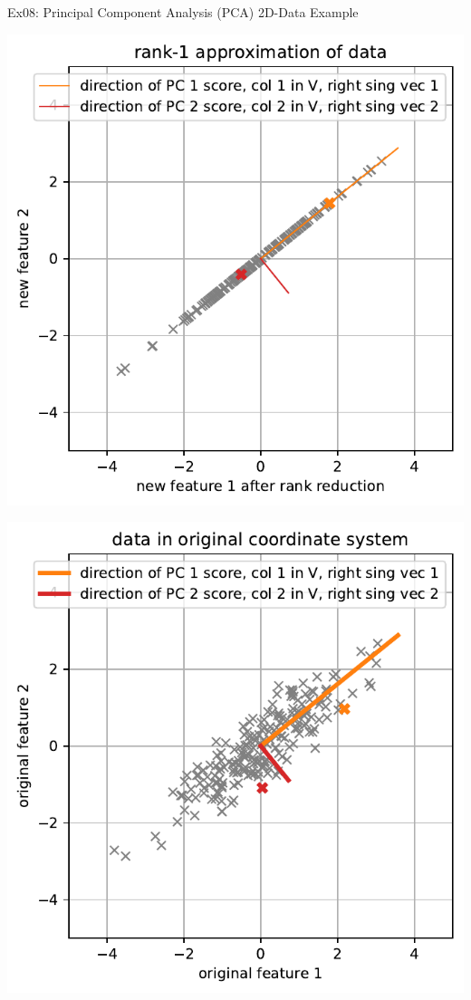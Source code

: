 \documentclass[mathserif, aspectratio=1610]{intbeamer}
\begin{document}
\begin{frame}[t]{Ex08: Principal Component Analysis (PCA) 2D-Data Example}
\begin{minipage}[t]{0.49\textwidth}
\includegraphics[width=\textwidth]{pca_2d_truncated_svd.pdf}
\end{minipage}
%
\begin{minipage}[t]{0.49\textwidth}
\includegraphics[width=\textwidth]{pca_2d_original_data_with_pcdir.pdf}
\end{minipage}
\end{frame}
\end{document}
